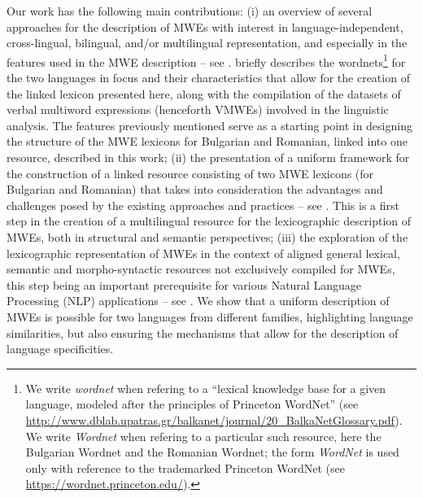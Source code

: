 \documentclass[output=paper,colorlinks,citecolor=brown]{langscibook}
\begin{document}
Our work has the following main contributions: 
(i) an overview of several approaches for the description of MWEs with interest in language-independent, cross-lingual, bilingual, and/or multilingual representation, and especially in the features used in the MWE description -- see .  %
briefly describes the wordnets\footnote{We write \textit{wordnet} when refering to a ``lexical knowledge base for a given language, modeled after the principles
of Princeton WordNet'' (see \url{http://www.dblab.upatras.gr/balkanet/journal/20_BalkaNetGlossary.pdf}). We write \textit{Wordnet} when refering to a particular such resource, here the Bulgarian Wordnet and the Romanian Wordnet; the form \textit{WordNet} is used only with reference to the trademarked Princeton WordNet (see \url{https://wordnet.princeton.edu/}).} for the two languages in focus and their characteristics that allow for the creation of the linked lexicon presented here, along with the compilation of the datasets of verbal multiword expressions (henceforth VMWEs) involved in the linguistic analysis. The features previously mentioned serve as a starting point in designing the structure of the MWE lexicons for Bulgarian and Romanian, linked into one resource, described in this work;
(ii) the presentation of a uniform framework for the construction of a linked resource consisting of two MWE lexicons (for Bulgarian and Romanian) that takes into consideration the advantages and challenges posed by the existing approaches and practices -- see . This is a first step in the creation of a multilingual resource for the lexicographic description of MWEs, both in structural and semantic perspectives;
(iii) the exploration of the lexicographic representation of MWEs in the context of aligned general lexical, semantic and morpho-syntactic resources not exclusively compiled for MWEs, this step being an important prerequisite for various Natural Language Processing (NLP) applications -- see .
We show that a uniform description of MWEs is possible for two languages from different families, highlighting language similarities, but also ensuring the mechanisms that allow for the description of language specificities.
\end{document}
